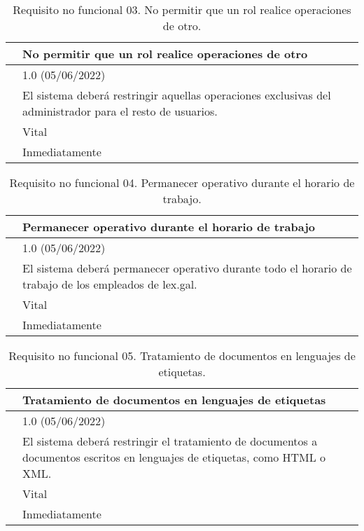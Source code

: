 \begin{table}[H]
\begin{center}
\begin{tabular}{|p{3cm}|p{10cm}|} \hline
\centering {\bf NFR-03} & No permitir que un rol realice operaciones de otro  \\ \hline\hline
\centering {\bf Versión} & 1.0 (05/06/2022) \\ \hline
\centering {\bf Descripción} & El sistema deberá restringir aquellas operaciones exclusivas del administrador para el resto de usuarios. \\ \hline
\centering {\bf Importancia} & Vital \\ \hline
\centering {\bf Urgencia} & Inmediatamente \\ \hline
\end{tabular}
\caption{Requisito no funcional 03. No permitir que un rol realice operaciones de otro.}
\label{enlaceNFR3}
\end{center}
\end{table}

\begin{table}[H]
\begin{center}
\begin{tabular}{|p{3cm}|p{10cm}|} \hline
\centering {\bf NFR-04} & Permanecer operativo durante el horario de trabajo \\ \hline\hline
\centering {\bf Versión} & 1.0 (05/06/2022) \\ \hline
\centering {\bf Descripción} & El sistema deberá permanecer operativo durante todo el horario de trabajo de los empleados de lex.gal.  \\ \hline
\centering {\bf Importancia} & Vital \\ \hline
\centering {\bf Urgencia} & Inmediatamente \\ \hline
\end{tabular}
\caption{Requisito no funcional 04. Permanecer operativo durante el horario de trabajo.}
\label{enlaceNFR4}
\end{center}
\end{table}

\begin{table}[H]
\begin{center}
\begin{tabular}{|p{3cm}|p{10cm}|} \hline
\centering {\bf NFR-05} & Tratamiento de documentos en lenguajes de etiquetas  \\ \hline\hline
\centering {\bf Versión} & 1.0 (05/06/2022) \\ \hline
\centering {\bf Descripción} & El sistema deberá restringir el tratamiento de documentos a documentos escritos en lenguajes de etiquetas, como HTML o XML. \\ \hline
\centering {\bf Importancia} & Vital \\ \hline
\centering {\bf Urgencia} & Inmediatamente \\ \hline
\end{tabular}
\caption{Requisito no funcional 05. Tratamiento de documentos en lenguajes de etiquetas.}
\label{enlaceNFR5}
\end{center}
\end{table}

